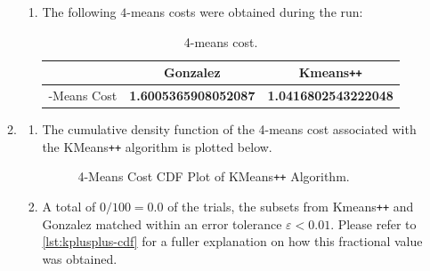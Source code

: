 \documentclass{article}
\begin{document}
\begin{enumerate}[leftmargin={*}, font={\bf}, label={\arabic*.}, ref={\arabic*}]
\begin{enumerate}[label={(\Alph*)}, ref={\theenumi(\Alph*)}]
\begin{enumerate}[label={(\roman*)}, ref={\theenumii(\roman*)}]
          \item
            The following $4$-means costs were obtained during the run:
            \begin{table}[H]
              \centering
              \begin{tabular}{|c|c|c|}
                \hline
                & {\sf Gonzalez} & {\sf Kmeans{\tt++}} \\ \hline
                {\sf 4-Means Cost} & {\bf 1.6005365908052087} & {\bf 1.0416802543222048} \\ \hline
              \end{tabular}
              \caption{4-means cost.}
            \end{table}
        \end{enumerate}

      \item \label{qst:2B}
        \begin{enumerate}[label={(\roman*)}, ref={\theenumii(\roman*)}]
          \item
            The cumulative density function of the 4-means cost associated with the
            {\sf KMeans{\tt++}} algorithm is plotted below.
            \begin{figure}[H]
              \centering
              \caption{
                4-Means Cost CDF Plot of {\sf KMeans{\tt++}} Algorithm.
              }
              \label{fig:4-means-cost-kmeans-cdf-plot}
            \end{figure}

          \item
            A total of $0 / 100 = 0.0$ of the trials, the subsets from {\sf Kmeans{\tt++}} and
            {\sf Gonzalez} matched within an error tolerance $\varepsilon < 0.01$. Please refer
            to \autoref{lst:kplusplus-cdf} for a fuller explanation on how this fractional value
            was obtained.
        \end{enumerate}


\end{enumerate}
\end{enumerate}
\end{document}
